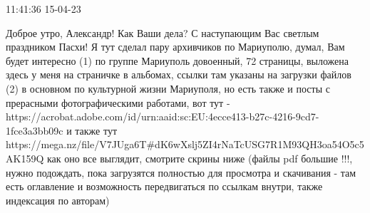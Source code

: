 11:41:36 15-04-23

Доброе утро, Александр! Как Ваши дела? С наступающим Вас светлым праздником
Пасхи! Я тут сделал пару архивчиков по Мариуполю, думал, Вам будет интересно
(1) по группе Мариуполь довоенный, 72 страницы, выложена здесь у меня на
страничке в альбомах, ссылки там указаны на загрузки файлов (2) в основном по
культурной жизни Мариуполя, но есть также и посты с прерасными фотографическими
работами, вот тут -
https://acrobat.adobe.com/id/urn:aaid:sc:EU:4ecce413-b27c-4216-9cd7-1fce3a3bb09c
и также тут
https://mega.nz/file/V7JUga6T#dK6wXslj5ZI4rNaTcUSG7R1M93QH3oa54O5c5AK159Q как
оно все выглядит, смотрите скрины ниже (файлы pdf большие !!!, нужно подождать,
пока загрузятся полностью для просмотра и скачивания - там есть оглавление и
возможность передвигаться по ссылкам внутри, также индексация по авторам)


